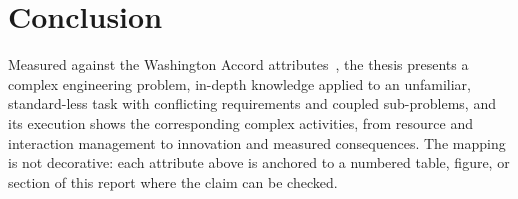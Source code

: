\section{Conclusion}
Measured against the Washington Accord attributes~\cite{iea2021gapc}, the
thesis presents a complex engineering problem, in-depth knowledge applied to
an unfamiliar, standard-less task with conflicting requirements and coupled
sub-problems, and its execution shows the corresponding complex activities,
from resource and interaction management to innovation and measured
consequences. The mapping is not decorative: each attribute above is
anchored to a numbered table, figure, or section of this report where the
claim can be checked.
